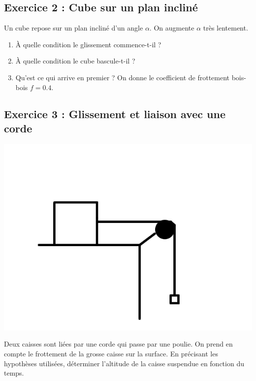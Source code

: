 \subsection{Exercice 2 : Cube sur un plan incliné}

Un cube repose sur un plan incliné d'un angle $\alpha$. On augmente $\alpha$ très lentement.

\begin{enumerate}
	\item À quelle condition le glissement commence-t-il ?
	\item À quelle condition le cube bascule-t-il ?
	\item Qu'est ce qui arrive en premier ? On donne le coefficient de frottement bois-bois $f = 0.4$.
\end{enumerate}

\subsection{Exercice 3 : Glissement et liaison avec une corde}

\begin{minipage}[c]{\linewidth/2}
	\includegraphics{./Images/mp_s05_ex03.png}
\end{minipage}%
\begin{minipage}[c]{\linewidth/2}
	Deux caisses sont liées par une corde qui passe par une poulie. On prend en compte le frottement de la grosse caisse sur la surface. En précisant les hypothèses utilisées, déterminer l'altitude de la caisse suspendue en fonction du temps.
\end{minipage}